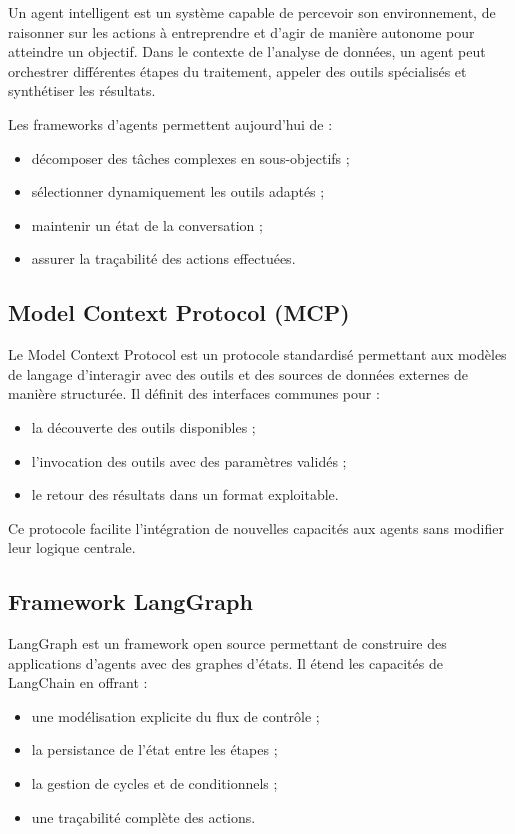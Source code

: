 Un agent intelligent est un système capable de percevoir son environnement, de raisonner sur les actions à entreprendre et d'agir de manière autonome pour atteindre un objectif. Dans le contexte de l'analyse de données, un agent peut orchestrer différentes étapes du traitement, appeler des outils spécialisés et synthétiser les résultats.

Les frameworks d'agents permettent aujourd'hui de :

\begin{itemize}
  \item décomposer des tâches complexes en sous-objectifs ;
  \item sélectionner dynamiquement les outils adaptés ;
  \item maintenir un état de la conversation ;
  \item assurer la traçabilité des actions effectuées.
\end{itemize}

\subsection{Model Context Protocol (MCP)}

Le Model Context Protocol est un protocole standardisé permettant aux modèles de langage d'interagir avec des outils et des sources de données externes de manière structurée. Il définit des interfaces communes pour :

\begin{itemize}
  \item la découverte des outils disponibles ;
  \item l'invocation des outils avec des paramètres validés ;
  \item le retour des résultats dans un format exploitable.
\end{itemize}

Ce protocole facilite l'intégration de nouvelles capacités aux agents sans modifier leur logique centrale.

\subsection{Framework LangGraph}

LangGraph est un framework open source permettant de construire des applications d'agents avec des graphes d'états. Il étend les capacités de LangChain en offrant :

\begin{itemize}
  \item une modélisation explicite du flux de contrôle ;
  \item la persistance de l'état entre les étapes ;
  \item la gestion de cycles et de conditionnels ;
  \item une traçabilité complète des actions.
\end{itemize}

